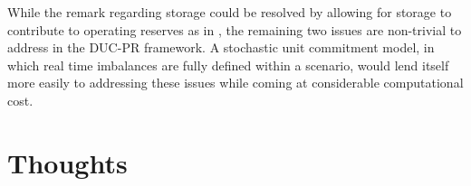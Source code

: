 \documentclass[number,times]{elsarticle}
\begin{document}
While the remark regarding storage could be resolved by allowing for storage to contribute to operating reserves as in \cite{Bruninx2016}, the remaining two issues are non-trivial to address in the DUC-PR framework. A stochastic unit commitment model, in which real time imbalances are fully defined within a scenario, would lend itself more easily to addressing these issues while coming at considerable computational cost.

\section{Thoughts}

\clearpage


\end{document}
